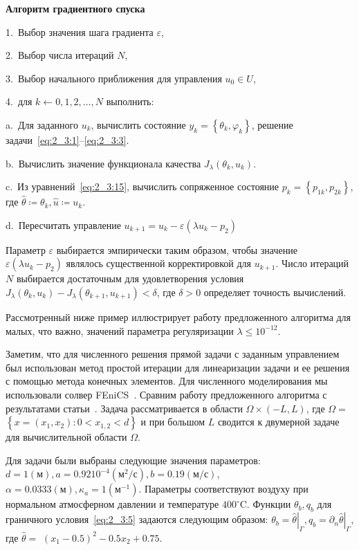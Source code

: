\textbf{Алгоритм градиентного спуска}

1.\ Выбор значения шага градиента $\varepsilon$,

2.\ Выбор числа итераций $N$,

3.\ Выбор начального приближения для управления $u_{0} \in U$,

4.\ для $k \leftarrow 0,1,2, \ldots, N$ выполнить:

\hspace{1cm} a.\ Для заданного $u_{k}$, вычислить состояние
$y_{k}=\left\{\theta_{k}, \varphi_{k}\right\}$, решение
задачи~\eqref{eq:2_3:1}--\eqref{eq:2_3:3}.

\hspace{1cm} b.\ Вычислить значение функционала качества
$J_{\lambda}\left(\theta_{k}, u_{k}\right)$.

\hspace{1cm} c.\ Из уравнений~\eqref{eq:2_3:15}, вычислить сопряженное
состояние $p_{k}=\left\{p_{1 k}, p_{2 k}\right\}$,
где $\widehat{\theta} \coloneqq \theta_{k}, \widehat{u} \coloneqq u_{k}$.

\hspace{1cm} d.\ Пересчитать управление
$u_{k+1}=u_{k}-\varepsilon\left(\lambda u_{k}-p_{2}\right)$

Параметр $\varepsilon$ выбирается эмпирически таким образом, чтобы
значение $\varepsilon\left(\lambda u_{k}-p_{2}\right)$ являлось
существенной корректировкой для $u_{k+1}$.
Число итераций $N$ выбирается достаточным для
удовлетворения условия $J_{\lambda}\left(\theta_{k}, u_{k}\right)
-J_{\lambda}\left(\theta_{k+1}, u_{k+1}\right)<\delta$, где $\delta>0$
определяет точность вычислений.

Рассмотренный ниже пример иллюстрирует работу предложенного
алгоритма для малых, что важно, значений параметра регуляризации
$\lambda \leq 10^{-12}$.


Заметим, что для численного решения прямой задачи с заданным управлением
был использован метод простой итерации для линеаризации задачи и ее решения
с помощью метода конечных элементов.
Для численного моделирования мы использовали солвер FEniCS~\cite{fenics, dolfin}.
Сравним работу предложенного
алгоритма с результатами статьи~\cite{Chebotarev2019Problem}.
Задача рассматривается в области $\Omega \times(-L, L)$,
где $\Omega=$ $\left\{x=\left(x_{1}, x_{2}\right): 0<x_{1,2}<d\right\}$
и при большом $L$ сводится к двумерной задаче для вычислительной
области $\Omega$.

Для задачи были выбраны следующие значения параметров:
$d=1(\text{м}), a=0.9210^{-4}(\text{м}^{2} / \text{с}),
b=0.19(\text{м} / \text{с})$, $\alpha=0.0333(\text{м}),
\kappa_{a}=1\left(\text{м}^{-1}\right)$.
Параметры соответствуют воздуху при нормальном атмосферном давлении
и температуре $400^{\circ} \mathrm{C}$.
Функции $\theta_{b}, q_{b}$ для граничного условия~\eqref{eq:2_3:5}
задаются следующим образом: $\theta_{b}=\left.\widehat{\theta}\right|_{\Gamma},
q_{b}=\left.\partial_{n} \widehat{\theta}\right|_{\Gamma}$,
где $\widehat{\theta}=$ $\left(x_{1}-0.5\right)^{2}-0.5 x_{2}+0.75$.

